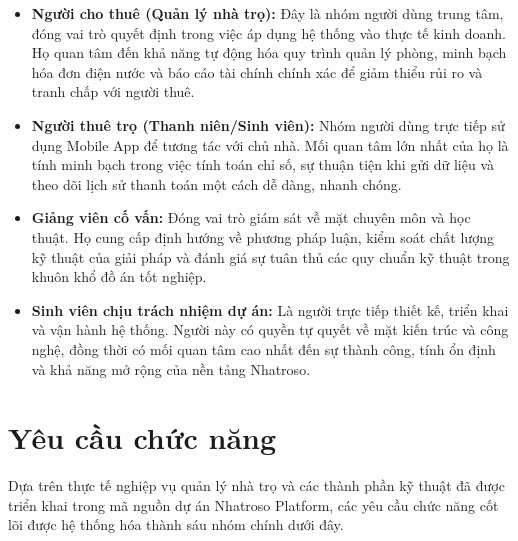 \begin{itemize}
    \item \textbf{Người cho thuê (Quản lý nhà trọ):} Đây là nhóm người dùng trung tâm, đóng vai trò quyết định trong việc áp dụng hệ thống vào thực tế kinh doanh. Họ quan tâm đến khả năng tự động hóa quy trình quản lý phòng, minh bạch hóa đơn điện nước và báo cáo tài chính chính xác để giảm thiểu rủi ro và tranh chấp với người thuê.
    \item \textbf{Người thuê trọ (Thanh niên/Sinh viên):} Nhóm người dùng trực tiếp sử dụng Mobile App để tương tác với chủ nhà. Mối quan tâm lớn nhất của họ là tính minh bạch trong việc tính toán chỉ số, sự thuận tiện khi gửi dữ liệu và theo dõi lịch sử thanh toán một cách dễ dàng, nhanh chóng.
    \item \textbf{Giảng viên cố vấn:} Đóng vai trò giám sát về mặt chuyên môn và học thuật. Họ cung cấp định hướng về phương pháp luận, kiểm soát chất lượng kỹ thuật của giải pháp và đánh giá sự tuân thủ các quy chuẩn kỹ thuật trong khuôn khổ đồ án tốt nghiệp.
    \item \textbf{Sinh viên chịu trách nhiệm dự án:} Là người trực tiếp thiết kế, triển khai và vận hành hệ thống. Người này có quyền tự quyết về mặt kiến trúc và công nghệ, đồng thời có mối quan tâm cao nhất đến sự thành công, tính ổn định và khả năng mở rộng của nền tảng Nhatroso.
\end{itemize}

\section{Yêu cầu chức năng}

Dựa trên thực tế nghiệp vụ quản lý nhà trọ và các thành phần kỹ thuật đã được triển khai trong mã nguồn dự án Nhatroso Platform, các yêu cầu chức năng cốt lõi được hệ thống hóa thành sáu nhóm chính dưới đây.

